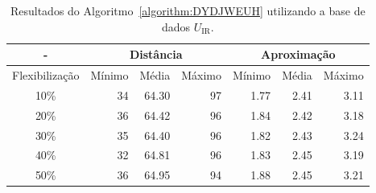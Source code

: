 \begin{table}[!htb]
  \caption{Resultados do Algoritmo~\ref{algorithm:DYDJWEUH} utilizando a base de dados $U_{\text{IR}}$.}
  \label{table:RITAXFPQ}
  \centering
  \begin{tabular}{|c|r|r|r|r|r|r|}
    \hline
      -            & \multicolumn{3}{c|}{Distância}             & \multicolumn{3}{c|}{Aproximação}           \\ \hline
    Flexibilização & Mínimo       & Média        & Máximo       & Mínimo       & Média        & Máximo       \\ \hline  
    10\%           & 34           & 64.30        & 97           & 1.77         & 2.41         & 3.11         \\ \hline
    20\%           & 36           & 64.42        & 96           & 1.84         & 2.42         & 3.18         \\ \hline
    30\%           & 35           & 64.40        & 96           & 1.82         & 2.43         & 3.24         \\ \hline
    40\%           & 32           & 64.81        & 96           & 1.83         & 2.45         & 3.19         \\ \hline
    50\%           & 36           & 64.95        & 94           & 1.88         & 2.45         & 3.21         \\ \hline    
  \end{tabular}
\end{table}